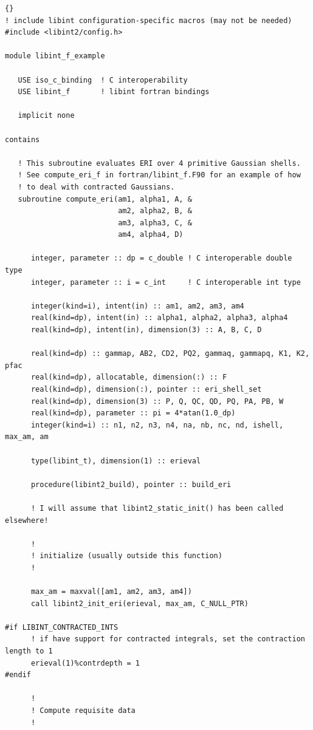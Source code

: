 \documentclass[10pt]{article}
\begin{document}
\begin{lstlisting}[label=lst:usefortran, caption=Using \LIBINT\ from Fortran.]{}
! include libint configuration-specific macros (may not be needed)
#include <libint2/config.h>

module libint_f_example

   USE iso_c_binding  ! C interoperability
   USE libint_f       ! libint fortran bindings

   implicit none

contains

   ! This subroutine evaluates ERI over 4 primitive Gaussian shells.
   ! See compute_eri_f in fortran/libint_f.F90 for an example of how
   ! to deal with contracted Gaussians.
   subroutine compute_eri(am1, alpha1, A, &
                          am2, alpha2, B, &
                          am3, alpha3, C, &
                          am4, alpha4, D)

      integer, parameter :: dp = c_double ! C interoperable double type
      integer, parameter :: i = c_int     ! C interoperable int type

      integer(kind=i), intent(in) :: am1, am2, am3, am4
      real(kind=dp), intent(in) :: alpha1, alpha2, alpha3, alpha4
      real(kind=dp), intent(in), dimension(3) :: A, B, C, D

      real(kind=dp) :: gammap, AB2, CD2, PQ2, gammaq, gammapq, K1, K2, pfac
      real(kind=dp), allocatable, dimension(:) :: F
      real(kind=dp), dimension(:), pointer :: eri_shell_set
      real(kind=dp), dimension(3) :: P, Q, QC, QD, PQ, PA, PB, W
      real(kind=dp), parameter :: pi = 4*atan(1.0_dp)
      integer(kind=i) :: n1, n2, n3, n4, na, nb, nc, nd, ishell, max_am, am

      type(libint_t), dimension(1) :: erieval

      procedure(libint2_build), pointer :: build_eri

      ! I will assume that libint2_static_init() has been called elsewhere!

      !
      ! initialize (usually outside this function)
      !

      max_am = maxval([am1, am2, am3, am4])
      call libint2_init_eri(erieval, max_am, C_NULL_PTR)

#if LIBINT_CONTRACTED_INTS
      ! if have support for contracted integrals, set the contraction length to 1
      erieval(1)%contrdepth = 1
#endif

      !
      ! Compute requisite data
      !


\end{lstlisting}
\end{document}

